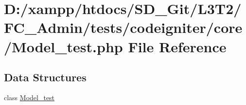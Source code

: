 \hypertarget{_admin_2tests_2codeigniter_2core_2_model__test_8php}{}\section{D\+:/xampp/htdocs/\+S\+D\+\_\+\+Git/\+L3\+T2/\+F\+C\+\_\+\+Admin/tests/codeigniter/core/\+Model\+\_\+test.php File Reference}
\label{_admin_2tests_2codeigniter_2core_2_model__test_8php}
\subsection*{Data Structures}
\begin{DoxyCompactItemize}
\item 
class \hyperlink{class_model__test}{Model\+\_\+test}
\end{DoxyCompactItemize}
